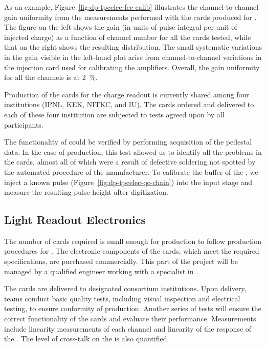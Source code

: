 As an example, Figure~\ref{fig:dp-tpcelec-fec-calib} illustrates the channel-to-channel gain uniformity from the measurements performed with the  cards produced for . The figure on the left shows the gain (in units of pulse integral per unit of injected charge) as a function of channel number for all the cards tested, while that on the right shows the resulting distribution. The small systematic variations in the gain visible in the left-hand plot arise from channel-to-channel variations in the injection card used for calibrating the  amplifiers. Overall, the gain uniformity for all the channels is at \SI{2}{\percent}.

Production of the  cards for the charge readout is currently shared among four institutions (IPNL, KEK, NITKC, and IU). 
The cards ordered and delivered to each of these four institution are subjected to  tests agreed upon by all participants. 

The functionality of  could be verified by performing acquisition of the pedestal data. In the case of  production, this test allowed us to identify all the problems in the cards, almost all of which were a result of defective soldering not spotted by the automated  procedure of the manufacturer. To calibrate the  buffer of the  , we inject a known pulse (Figure~\ref{fig:dp-tpcelec-qc-chain}) into the input stage and measure the resulting pulse height after digitization. 


\subsection{Light Readout Electronics}
\label{ssec:dp-tpcelec-prod-lro}


The number of   cards required is small enough for production to follow production procedures for .
The electronic components of the cards, which meet the required specifications, are purchased commercially. This part of the project will be managed by a qualified engineer working with a specialist in .

The cards are delivered to designated consortium institutions. Upon delivery, teams conduct basic quality tests, including visual inspection and electrical testing, to ensure conformity of production. Another series of tests will ensure the  %
correct %
functionality of the cards and evaluate their performance. Measurements include linearity measurements of each  channel and linearity of the response of the . The level of cross-talk on the  is also quantified. 

